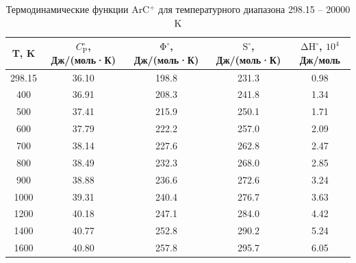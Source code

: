 \documentclass[12pt]{extarticle}
\begin{document}
    \begin{table}[H]
    	\footnotesize
    	\centering
  	    \caption{\label{tab:thermo_points} Термодинамические функции ArC$^{+}$ для температурного диапазона 298.15 -- 20000 K}
    	\begin{tabular}{|c|c|c|c|c|}
    		\hline
    		T, K  & $C_{\mathrm{P}}^\circ$, Дж/(моль·К) & ${\mathrm{\Phi}}^\circ$, Дж/(моль·К) & $\mathrm{S}^\circ$, Дж/(моль·К) & ${\mathrm{\Delta H}}^\circ$, $10^4$ Дж/моль \\ \hline
    		298.15   & 36.10                      & 198.8                       & 231.3                                        & 0.98                                \\
    		400   & 36.91                      & 208.3                       & 241.8                                        & 1.34                                \\
    		500   & 37.41                      & 215.9                       & 250.1                                        & 1.71                                \\
    		600   & 37.79                      & 222.2                       & 257.0                                        & 2.09                                \\
    		700   & 38.14                      & 227.6                       & 262.8                                        & 2.47                                \\
    		800   & 38.49                      & 232.3                       & 268.0                                        & 2.85                                \\
    		900   & 38.88                      & 236.6                       & 272.6                                        & 3.24                                \\
    		1000  & 39.31                      & 240.4                       & 276.7                                        & 3.63                                \\
    		1200  & 40.18                      & 247.1                       & 284.0                                        & 4.42                                \\
    		1400  & 40.77                      & 252.8                       & 290.2                                        & 5.24                                \\
    		1600  & 40.80                      & 257.8                       & 295.7                                        & 6.05                                \\

\end{tabular}
\end{table}
\end{document}
